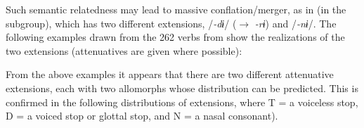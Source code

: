 \documentclass[output=paper]{langsci/langscibook}
\begin{document}
Such semantic relatedness may lead to massive conflation/merger, as in  (in the  subgroup), which has two different extensions, /\textit{-dɨ}/ (${\rightarrow}$ \textit{-rɨ}) and /\textit{-nɨ}/. The following examples drawn from the 262 verbs from \citet{Ngum2004} show the realizations of the two extensions (attenuatives are given where possible):

\ea%
    \label{ex:proto:17}
\ea
 \ex 
 \ex 
 \ex 
  \z
\z

From the above examples it appears that there are two different attenuative extensions, each with two allomorphs whose distribution can be predicted. This is confirmed in the following distributions of  extensions, where T = a voiceless stop, D = a voiced stop or glottal stop, and N = a nasal consonant).
\end{document}
